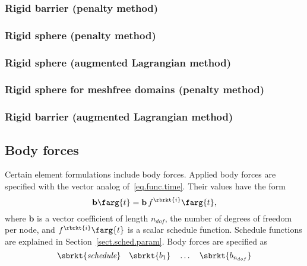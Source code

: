 \subsubsection{Rigid barrier (penalty method)}
\subsubsection{Rigid sphere (penalty method)}
\subsubsection{Rigid sphere (augmented Lagrangian method)}
\subsubsection{Rigid sphere for meshfree domains (penalty method)}
\subsubsection{Rigid barrier (augmented Lagrangian method)}

\subsection{Body forces}
\label{set.ICandBC.body}
Certain element formulations include body forces.
Applied body forces are specified with the vector analog 
of~\eqref{eq.func.time}.
Their values have the form
\begin{equation}
\label{eq.vec.func.time}
    \mathbf{b}\farg{t} = \mathbf{b}\,f^{\rbrkt{i}}\farg{t},
\end{equation}
where $\mathbf{b}$ is a vector coefficient of length $n_{dof}$, the 
number of degrees of freedom per node, and $f^{\rbrkt{i}}\farg{t}$ 
is a scalar schedule function. Schedule functions are explained in 
Section~\ref{sect.sched.param}.
Body forces are specified as
\[  
\sbrkt{\textit{schedule}} \quad 
\sbrkt{b_{1}} \quad \ldots \quad
\sbrkt{b_{n_{dof}}}
\]

